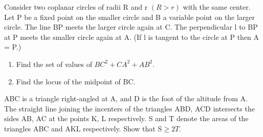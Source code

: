 \item Consider two coplanar circles of radii R and r $(R > r)$ with the same center. Let P be a fixed point on the smaller circle and B a variable point on the larger circle. The line BP meets the larger circle again at C. The perpendicular l to BP at P meets the smaller circle again at A. (If l is tangent to the circle at P
then A = P.)
\begin{enumerate}
\item Find the set of values of $BC^2 + CA^2 + AB^2$.
\item Find the locus of the midpoint of BC.
\end{enumerate}

\item ABC is a triangle right-angled at A, and D is the foot of the altitude from A. The straight line joining the incenters of the triangles ABD, ACD intersects the sides AB, AC at the points K, L respectively. S and T denote the areas of the triangles ABC and AKL respectively. Show that S$ \geq 2T$.






















